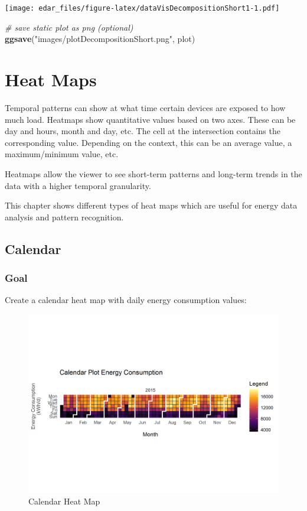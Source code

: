 \documentclass[
  a4paperpaper,
]{book}
\newenvironment{Shaded}{\begin{snugshade}}{\end{snugshade}}
\newcommand{\CommentTok}[1]{\textcolor[rgb]{0.56,0.35,0.01}{\textit{#1}}}
\newcommand{\KeywordTok}[1]{\textcolor[rgb]{0.13,0.29,0.53}{\textbf{#1}}}
\newcommand{\NormalTok}[1]{#1}
\newcommand{\StringTok}[1]{\textcolor[rgb]{0.31,0.60,0.02}{#1}}
\let\oldShaded\Shaded
\let\endoldShaded\endShaded
\renewenvironment{Shaded}{\footnotesize\oldShaded}{\endoldShaded}
\begin{document}
\texttt{[image: edar\_files/figure-latex/dataVisDecompositionShort1-1.pdf]}

\begin{Shaded}
\begin{Highlighting}[]
\CommentTok{# save static plot as png (optional)}
\KeywordTok{ggsave}\NormalTok{(}\StringTok{"images/plotDecompositionShort.png"}\NormalTok{, plot)}
\end{Highlighting}
\end{Shaded}

\hypertarget{heat-maps}{%
\chapter{Heat Maps}\label{heat-maps}}

Temporal patterns can show at what time certain devices are exposed to how much load. Heatmaps show quantitative values based on two axes. These can be day and hours, month and day, etc. The cell at the intersection contains the corresponding value. Depending on the context, this can be an average value, a maximum/minimum value, etc.

Heatmaps allow the viewer to see short-term patterns and long-term trends in the data with a higher temporal granularity.

This chapter shows different types of heat maps which are useful for energy data analysis and pattern recognition.

\newpage

\hypertarget{calendar}{%
\section{Calendar}\label{calendar}}

\hypertarget{goal-6}{%
\subsection{Goal}\label{goal-6}}

Create a calendar heat map with daily energy consumption values:

\begin{figure}
\includegraphics[width=0.7\linewidth]{images/plotHeatMapCalendar} \caption{Calendar Heat Map}\label{fig:unnamed-chunk-14}
\end{figure}
\end{document}

